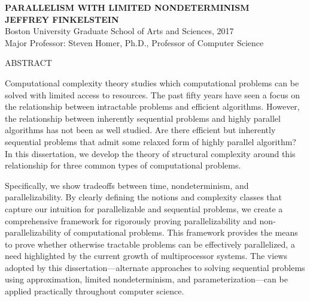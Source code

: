 \newenvironment{abstractpage}
  {\thispagestyle{plain}}
  {}

\begin{abstractpage}
  \begin{center}
    \textbf{\uppercase{Parallelism with limited nondeterminism}} \\
    \textbf{\uppercase{Jeffrey Finkelstein}} \\
    Boston University Graduate School of Arts and Sciences, 2017 \\
    Major Professor: Steven Homer, Ph.D., Professor of Computer Science
  \end{center}
  \begin{center}
    ABSTRACT
  \end{center}
  Computational complexity theory studies which computational problems can be solved with limited access to resources.
  The past fifty years have seen a focus on the relationship between intractable problems and efficient algorithms.
  However, the relationship between inherently sequential problems and highly parallel algorithms has not been as well studied.
  Are there efficient but inherently sequential problems that admit some relaxed form of highly parallel algorithm?
  In this dissertation, we develop the theory of structural complexity around this relationship for three common types of computational problems.

  Specifically, we show tradeoffs between time, nondeterminism, and parallelizability.
  By clearly defining the notions and complexity classes that capture our intuition for parallelizable and sequential problems, we create a comprehensive framework for rigorously proving parallelizability and non-parallelizability of computational problems.
  This framework provides the means to prove whether otherwise tractable problems can be effectively parallelized, a need highlighted by the current growth of multiprocessor systems.
  The views adopted by this dissertation---alternate approaches to solving sequential problems using approximation, limited nondeterminism, and parameterization---can be applied practically throughout computer science.
\end{abstractpage}
